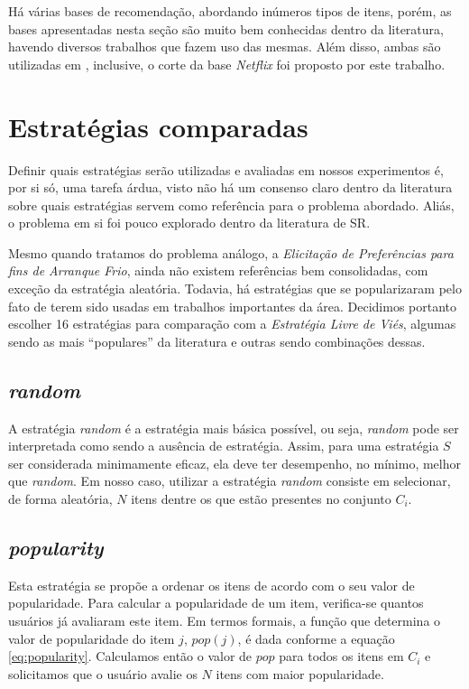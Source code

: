 Há várias bases de recomendação, abordando inúmeros tipos de itens, porém, as bases apresentadas nesta seção são muito bem conhecidas dentro da literatura, havendo diversos trabalhos que fazem uso das mesmas. Além disso, ambas são utilizadas em \citep{Elahi:2014:ALS:2542182.2542195}, inclusive, o corte da base \textit{Netflix} foi proposto por este trabalho.

\section{Estratégias comparadas}
\label{sec:estrategias}

Definir quais estratégias serão utilizadas e avaliadas em nossos experimentos é, por si só, uma tarefa árdua, visto não há um consenso claro dentro da literatura sobre quais estratégias servem como referência para o problema abordado. Aliás, o problema em si foi pouco explorado dentro da literatura de SR. 

Mesmo quando tratamos do problema análogo, a \textit{Elicitação de Preferências para fins de Arranque Frio}, ainda não existem referências bem consolidadas, com exceção da estratégia aleatória. Todavia, há estratégias que se popularizaram pelo fato de terem sido usadas em trabalhos importantes da área. Decidimos portanto escolher 16 estratégias para comparação com a \textit{Estratégia Livre de Viés}, algumas sendo as mais ``populares'' da literatura e outras sendo combinações dessas.

\subsection{\textit{random}}
A estratégia \textit{random} é a estratégia mais básica possível, ou seja, \textit{random} pode ser interpretada como sendo a ausência de estratégia. Assim, para uma estratégia $S$ ser considerada minimamente eficaz, ela deve ter desempenho, no mínimo, melhor que \textit{random}. Em nosso caso, utilizar a estratégia \textit{random} consiste em selecionar, de forma aleatória, $N$ itens dentre os que estão presentes no conjunto $C_i$.

\subsection{\textit{popularity}}
Esta estratégia se propõe a ordenar os itens de acordo com o seu valor de popularidade. Para calcular a popularidade de um item, verifica-se quantos usuários já avaliaram este item. Em termos formais, a função que determina o valor de popularidade do item $j$, $pop(j)$, é dada conforme a equação \ref{eq:popularity}. Calculamos então o valor de $pop$ para todos os itens em $C_i$ e solicitamos que o usuário avalie os $N$ itens com maior popularidade. 

